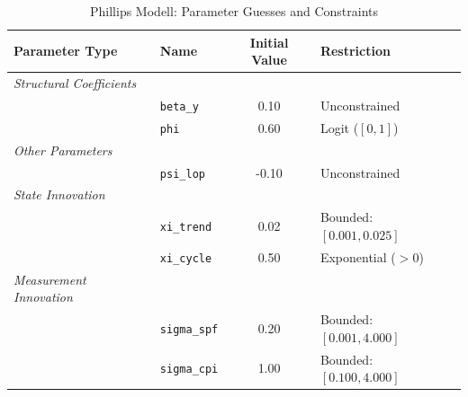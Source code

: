 \begin{table}[htbp]
\centering
\caption{Phillips Modell: Parameter Guesses and Constraints}
\label{tab:phillips_model_ssm_specs}
\begin{tabular}{llcl}
\hline\hline
\textbf{Parameter Type} & \textbf{Name} & \textbf{Initial Value} & \textbf{Restriction} \\ \hline
\textit{Structural Coefficients} &&& \\
    & \texttt{beta\_y} & 0.10 & Unconstrained \\
    & \texttt{phi} & 0.60 & Logit ($[0, 1]$) \\
\hline
\textit{Other Parameters} &&& \\
    & \texttt{psi\_lop} & -0.10 & Unconstrained \\
\hline
\textit{State Innovation} &&& \\
    & \texttt{xi\_trend} & 0.02 & Bounded: $[0.001, 0.025]$ \\
    & \texttt{xi\_cycle} & 0.50 & Exponential ($>0$) \\
\hline
\textit{Measurement Innovation} &&& \\
    & \texttt{sigma\_spf} & 0.20 & Bounded: $[0.001, 4.000]$ \\
    & \texttt{sigma\_cpi} & 1.00 & Bounded: $[0.100, 4.000]$ \\
\hline\hline
\end{tabular}
\end{table}
